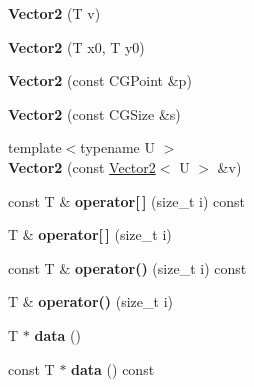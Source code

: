 \begin{DoxyCompactItemize}
{\bfseries Vector2} (T v)
\item 
\mbox{\label{struct_p_o_p_1_1_vector2_ab67659be8f73bf35585536b8685a7fb4}} 
{\bfseries Vector2} (T x0, T y0)
\item 
\mbox{\label{struct_p_o_p_1_1_vector2_aad4226a866036f7319671a2ea6895445}} 
{\bfseries Vector2} (const C\+G\+Point \&p)
\item 
\mbox{\label{struct_p_o_p_1_1_vector2_aba025746d868e3637159f99c8c828dde}} 
{\bfseries Vector2} (const C\+G\+Size \&s)
\item 
\mbox{\label{struct_p_o_p_1_1_vector2_a29c19d86228ee4d56f1eb9c229d1f3fc}} 
{\footnotesize template$<$typename U $>$ }\\{\bfseries Vector2} (const \mbox{\hyperlink{struct_p_o_p_1_1_vector2}{Vector2}}$<$ U $>$ \&v)
\item 
\mbox{\label{struct_p_o_p_1_1_vector2_a9766cdb5eb662b38c9d4c61007bdba96}} 
const T \& {\bfseries operator\mbox{[}$\,$\mbox{]}} (size\+\_\+t i) const
\item 
\mbox{\label{struct_p_o_p_1_1_vector2_aaaabf47246c0b0b89ac8076f269363e0}} 
T \& {\bfseries operator\mbox{[}$\,$\mbox{]}} (size\+\_\+t i)
\item 
\mbox{\label{struct_p_o_p_1_1_vector2_aaf8b70524e8bde74b260163a7037c16b}} 
const T \& {\bfseries operator()} (size\+\_\+t i) const
\item 
\mbox{\label{struct_p_o_p_1_1_vector2_a1cad01ccb52a8cf35352663a360006ea}} 
T \& {\bfseries operator()} (size\+\_\+t i)
\item 
\mbox{\label{struct_p_o_p_1_1_vector2_a0e8a54165d5d4208aab27788c9323aa3}} 
T $\ast$ {\bfseries data} ()
\item 
\mbox{\label{struct_p_o_p_1_1_vector2_a46e8504b4f3f110260c43035d206f280}} 
const T $\ast$ {\bfseries data} () const
\item 

\end{DoxyCompactItemize}
